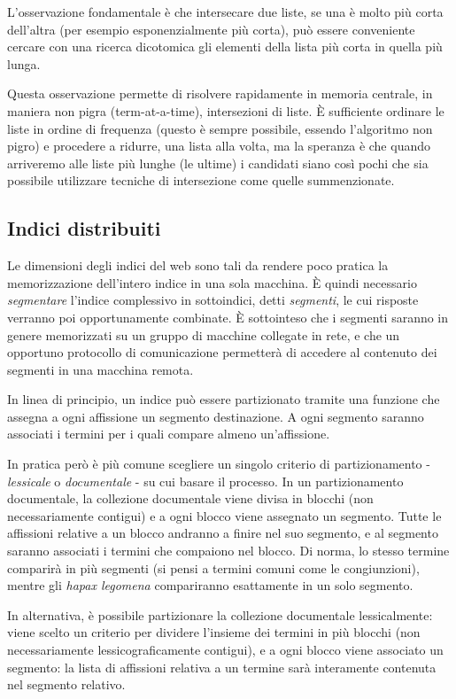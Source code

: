 L'osservazione fondamentale è che intersecare due liste, se una è molto più corta dell'altra (per esempio esponenzialmente più corta), può essere conveniente cercare con una ricerca dicotomica gli elementi della lista più corta in quella più lunga.

Questa osservazione permette di risolvere rapidamente in memoria centrale, in maniera non pigra (term-at-a-time), intersezioni di liste. È sufficiente ordinare le liste in ordine di frequenza (questo è sempre possibile, essendo l'algoritmo non pigro) e procedere a ridurre, una lista alla volta, ma la speranza è che quando arriveremo alle liste più lunghe (le ultime) i candidati siano così pochi che sia possibile utilizzare tecniche di intersezione come quelle summenzionate.
\subsection{Indici distribuiti}
Le dimensioni degli indici del web sono tali da rendere poco pratica la memorizzazione dell'intero indice in una sola macchina. È quindi necessario \textit{segmentare} l'indice complessivo in sottoindici, detti \textit{segmenti}, le cui risposte verranno poi opportunamente combinate. È sottointeso che i segmenti saranno in genere memorizzati su un gruppo di macchine collegate in rete, e che un opportuno protocollo di comunicazione permetterà di accedere al contenuto dei segmenti in una macchina remota.

In linea di principio, un indice può essere partizionato tramite una funzione che assegna a ogni affissione un segmento destinazione. A ogni segmento saranno associati i termini per i quali compare almeno un'affissione.

In pratica però è più comune scegliere un singolo criterio di partizionamento - \textit{lessicale} o \textit{documentale} - su cui basare il processo. In un partizionamento documentale, la collezione documentale viene divisa in blocchi (non necessariamente contigui) e a ogni blocco viene assegnato un segmento. Tutte le affissioni relative a un blocco andranno a finire nel suo segmento, e al segmento saranno associati i termini che compaiono nel blocco. Di norma, lo stesso termine comparirà in più segmenti (si pensi a termini comuni come le congiunzioni), mentre gli \textit{hapax legomena} compariranno esattamente in un solo segmento.

In alternativa, è possibile partizionare la collezione documentale lessicalmente: viene scelto un criterio per dividere l'insieme dei termini in più blocchi (non necessariamente lessicograficamente contigui), e a ogni blocco viene associato un segmento: la lista di affissioni relativa a un termine sarà interamente contenuta nel segmento relativo.

